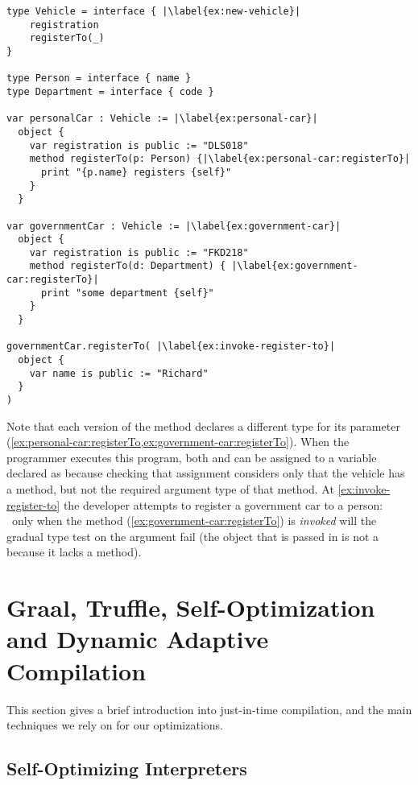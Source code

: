 \begin{lstlisting}[caption={A program in development with inconsistently
    typed \code{registerTo} methods.},escapechar=|,label={ex:complex},float,floatplacement=htb,columns=flexible,float,floatplacement=H]
type Vehicle = interface { |\label{ex:new-vehicle}|
    registration
    registerTo(_)
}

type Person = interface { name }
type Department = interface { code }

var personalCar : Vehicle := |\label{ex:personal-car}|
  object {
    var registration is public := "DLS018"
    method registerTo(p: Person) {|\label{ex:personal-car:registerTo}|
      print "{p.name} registers {self}"
    } 
  }

var governmentCar : Vehicle := |\label{ex:government-car}|
  object {
    var registration is public := "FKD218"
    method registerTo(d: Department) { |\label{ex:government-car:registerTo}|
      print "some department {self}"
    }
  }

governmentCar.registerTo( |\label{ex:invoke-register-to}|
  object {
    var name is public := "Richard"
  }
)
\end{lstlisting}


Note that each version of the  method
declares a different type for its parameter
(\cref{ex:personal-car:registerTo,ex:government-car:registerTo}).
%
When the programmer executes this program,
both  and  can be assigned to
a variable declared as  because checking that assignment considers only that the vehicle has
a  method, but not the required argument type of that
method.
%
At \cref{ex:invoke-register-to} the developer
attempts to register a government car to a person:%
~only when the method (\cref{ex:government-car:registerTo}) is \emph{invoked}
will the gradual type test on the argument fail
(the object that is passed in is not a  because it lacks a
 method).

\section{Graal, Truffle, Self-Optimization and Dynamic Adaptive Compilation}

This section gives a brief introduction into just-in-time compilation,
and the main techniques we rely on for our optimizations.

\subsection{Self-Optimizing Interpreters}

